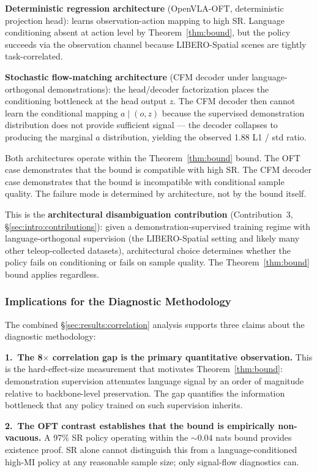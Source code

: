 \textbf{Deterministic regression architecture} (OpenVLA-OFT, deterministic projection
head): learns observation-action mapping to high SR. Language conditioning absent at
action level by Theorem~\ref{thm:bound}, but the policy succeeds via the observation
channel because LIBERO-Spatial scenes are tightly task-correlated.

\textbf{Stochastic flow-matching architecture} (CFM decoder under language-orthogonal
demonstrations): the head/decoder factorization places the conditioning bottleneck at
the head output $z$. The CFM decoder then cannot learn the conditional mapping $a \mid
(o, z)$ because the supervised demonstration distribution does not provide sufficient
signal --- the decoder collapses to producing the marginal $a$ distribution, yielding
the observed 1.88 L1 / std ratio.

Both architectures operate within the Theorem~\ref{thm:bound} bound. The OFT case
demonstrates that the bound is compatible with high SR. The CFM decoder case
demonstrates that the bound is incompatible with conditional sample quality. The
failure mode is determined by architecture, not by the bound itself.

This is the \textbf{architectural disambiguation contribution} (Contribution~3,
\S\ref{sec:intro:contributions}): given a demonstration-supervised training regime with
language-orthogonal supervision (the LIBERO-Spatial setting and likely many other
teleop-collected datasets), architectural choice determines whether the policy fails on
conditioning or fails on sample quality. The Theorem~\ref{thm:bound} bound applies
regardless.

\subsubsection{Implications for the Diagnostic Methodology}
\label{sec:results:correlation:implications}

The combined \S\ref{sec:results:correlation} analysis supports three claims about the
diagnostic methodology:

\textbf{1.~The 8$\times$ correlation gap is the primary quantitative observation.}
This is the hard-effect-size measurement that motivates Theorem~\ref{thm:bound}:
demonstration supervision attenuates language signal by an order of magnitude relative
to backbone-level preservation. The gap quantifies the information bottleneck that any
policy trained on such supervision inherits.

\textbf{2.~The OFT contrast establishes that the bound is empirically non-vacuous.}
A 97\% SR policy operating within the $\sim 0.04$ nats bound provides existence proof.
SR alone cannot distinguish this from a language-conditioned high-MI policy at any
reasonable sample size; only signal-flow diagnostics can.

